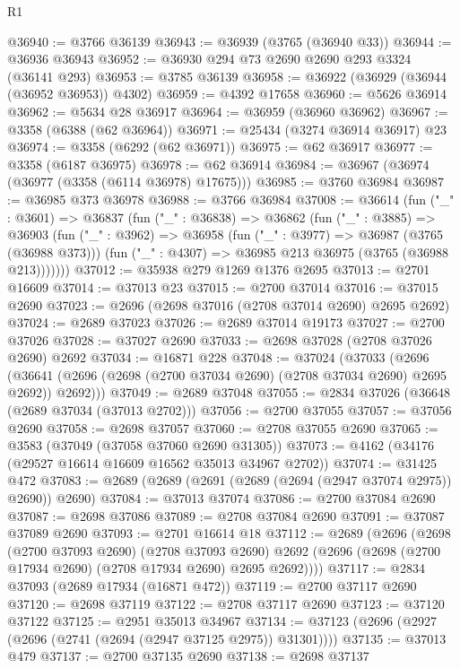 \begin{lexlean}{R1}
\begin{coremodule}
@36940 := @3766 @36139
@36943 := @36939 (@3765 (@36940 @33))
@36944 := @36936 @36943
@36952 := @36930 @294 @73 @2690 @2690 @293 @3324 (@36141 @293)
@36953 := @3785 @36139
@36958 := @36922 (@36929 (@36944 (@36952 @36953)) @4302)
@36959 := @4392 @17658
@36960 := @5626 @36914
@36962 := @5634 @28 @36917
@36964 := @36959 (@36960 @36962)
@36967 := @3358 (@6388 (@62 @36964))
@36971 := @25434 (@3274 @36914 @36917) @23
@36974 := @3358 (@6292 (@62 @36971))
@36975 := @62 @36917
@36977 := @3358 (@6187 @36975)
@36978 := @62 @36914
@36984 := @36967 (@36974 (@36977 (@3358 (@6114 @36978) @17675)))
@36985 := @3760 @36984
@36987 := @36985 @373 @36978
@36988 := @3766 @36984
@37008 := @36614
    (fun ("_" : @3601) =>
    @36837
      (fun ("_" : @36838) =>
      @36862
        (fun ("_" : @3885) =>
        @36903
          (fun ("_" : @3962) =>
          @36958
            (fun ("_" : @3977) => @36987 (@3765 (@36988 @373)))
            (fun ("_" : @4307) => @36985 @213 @36975 (@3765 (@36988 @213)))))))
@37012 := @35938 @279 @1269 @1376 @2695
@37013 := @2701 @16609
@37014 := @37013 @23
@37015 := @2700 @37014
@37016 := @37015 @2690
@37023 := @2696 (@2698 @37016 (@2708 @37014 @2690) @2695 @2692)
@37024 := @2689 @37023
@37026 := @2689 @37014 @19173
@37027 := @2700 @37026
@37028 := @37027 @2690
@37033 := @2698 @37028 (@2708 @37026 @2690) @2692
@37034 := @16871 @228
@37048 := @37024
    (@37033
      (@2696 (@36641 (@2696 (@2698 (@2700 @37034 @2690) (@2708 @37034 @2690) @2695 @2692)) @2692)))
@37049 := @2689 @37048
@37055 := @2834 @37026 (@36648 (@2689 @37034 (@37013 @2702)))
@37056 := @2700 @37055
@37057 := @37056 @2690
@37058 := @2698 @37057
@37060 := @2708 @37055 @2690
@37065 := @3583 (@37049 (@37058 @37060 @2690 @31305))
@37073 := @4162 (@34176 (@29527 @16614 @16609 @16562 @35013 @34967 @2702))
@37074 := @31425 @472
@37083 := @2689 (@2689 (@2691 (@2689 (@2694 (@2947 @37074 @2975)) @2690)) @2690)
@37084 := @37013 @37074
@37086 := @2700 @37084 @2690
@37087 := @2698 @37086
@37089 := @2708 @37084 @2690
@37091 := @37087 @37089 @2690
@37093 := @2701 @16614 @18
@37112 := @2689
    (@2696
      (@2698
        (@2700 @37093 @2690)
        (@2708 @37093 @2690)
        @2692
        (@2696 (@2698 (@2700 @17934 @2690) (@2708 @17934 @2690) @2695 @2692))))
@37117 := @2834 @37093 (@2689 @17934 (@16871 @472))
@37119 := @2700 @37117 @2690
@37120 := @2698 @37119
@37122 := @2708 @37117 @2690
@37123 := @37120 @37122
@37125 := @2951 @35013 @34967
@37134 := @37123 (@2696 (@2927 (@2696 (@2741 (@2694 (@2947 @37125 @2975)) @31301))))
@37135 := @37013 @479
@37137 := @2700 @37135 @2690
@37138 := @2698 @37137

\end{coremodule}
\end{lexlean}
